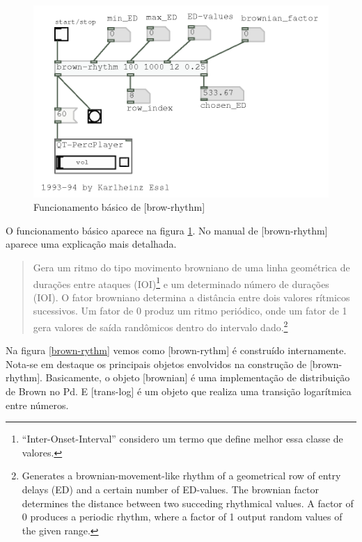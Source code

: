 \documentclass{ppgmus}
\begin{document}
 \begin{figure}
\includegraphics[scale=.6]{brown-rhythm-func}
\caption{Funcionamento básico de [brow-rhythm]}
\label{brown-rythm-func}
\end{figure} 


O funcionamento básico aparece na figura \ref{brown-rythm-func}.
No manual de [brown-rhythm] aparece uma explicação mais detalhada.


\begin{quote}
Gera um ritmo do tipo movimento browniano de uma linha geométrica de
durações entre ataques (IOI)\footnote{ ``Inter-Onset-Interval'' considero 
um termo que define melhor essa classe de valores.}  e um determinado número de durações
(IOI). O fator browniano determina a distância entre dois valores rítmicos sucessivos. 
Um fator de 0 produz um ritmo periódico, onde um fator de 1 gera valores de saída randômicos
dentro do intervalo dado.\footnote{
Generates a brownian-movement-like rhythm of a geometrical row of
entry delays (ED) and a certain number of ED-values. The brownian factor
determines the distance between two succeding rhythmical values. A factor
of 0 produces a periodic rhythm, where a factor of 1 output random values 
of the given range.} 
\end{quote}



  



Na figura \ref{brown-rythm} vemos como [brown-rythm] é construído internamente.
Nota-se em destaque os principais objetos envolvidos na construção
de [brown-rhythm]. Basicamente, o objeto [brownian] é uma implementação de
distribuição de Brown no Pd. E [trans-log] é um objeto que realiza uma
transição logarítmica entre números.
\end{document}
